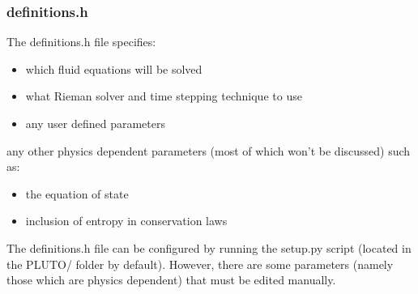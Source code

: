 \documentclass[12pt]{article}
\begin{document}
\subsubsection{definitions.h}
The definitions.h file specifies:
\begin{itemize}
	\item which fluid equations will be solved
	\item what Rieman solver and time stepping technique to use
	\item any user defined parameters
\end{itemize}
any other physics dependent parameters (most of which won't be discussed) such as:
\begin{itemize}
	\item the equation of state
	\item inclusion of entropy in conservation laws
\end{itemize}
 
The definitions.h file can be configured by running the setup.py script (located in the PLUTO/ folder by default). However, there are some parameters (namely those which are physics dependent) that must be edited manually.
\end{document}
